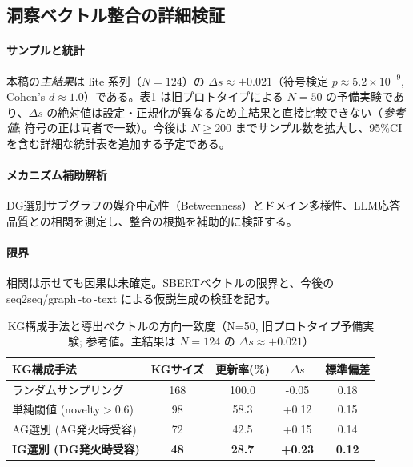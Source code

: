 \documentclass[ja=standard,xelatex]{bxjsarticle}
\begin{document}
\subsection{洞察ベクトル整合の詳細検証}\label{sec:insight_alignment_detail}
\paragraph{サンプルと統計}\; 本稿の\emph{主結果}は lite 系列（$N{=}124$）の $\Delta s\approx+0.021$（符号検定 $p\approx5.2\times10^{-9}$, Cohen's $d\approx1.0$）である。表\ref{tab:insight_vector_preliminary} は旧プロトタイプによる $N{=}50$ の予備実験であり、$\Delta s$ の絶対値は設定・正規化が異なるため主結果と直接比較できない（\emph{参考値}; 符号の正は両者で一致）。今後は $N\!\ge\!200$ までサンプル数を拡大し、95\%CI を含む詳細な統計表を追加する予定である。\\
\paragraph{メカニズム補助解析}\; DG選別サブグラフの媒介中心性（Betweenness）とドメイン多様性、LLM応答品質との相関を測定し、整合の根拠を補助的に検証する。\\
\paragraph{限界}\; 相関は示せても因果は未確定。SBERTベクトルの限界と、今後の seq2seq/graph\,\mbox{-}to\,\mbox{-}text による仮説生成の検証を記す。

\begin{table}[H]
\centering
\caption{KG構成手法と導出ベクトルの方向一致度（N=50, 旧プロトタイプ予備実験; 参考値。主結果は $N{=}124$ の $\Delta s\approx+0.021$）}
\label{tab:insight_vector_preliminary}
\begin{tabular}{lcccc}
\toprule
KG構成手法 & KGサイズ & 更新率(\%) & $\Delta s$ & 標準偏差 \\
\midrule
ランダムサンプリング & 168 & 100.0 & -0.05 & 0.18 \\
単純閾値 (novelty$>$0.6) & 98 & 58.3 & +0.12 & 0.15 \\
AG選別 (AG発火時受容) & 72 & 42.5 & +0.15 & 0.14 \\
\textbf{IG選別 (DG発火時受容)} & \textbf{48} & \textbf{28.7} & \textbf{+0.23} & \textbf{0.12} \\
\bottomrule
\end{tabular}
\end{table}
\end{document}
